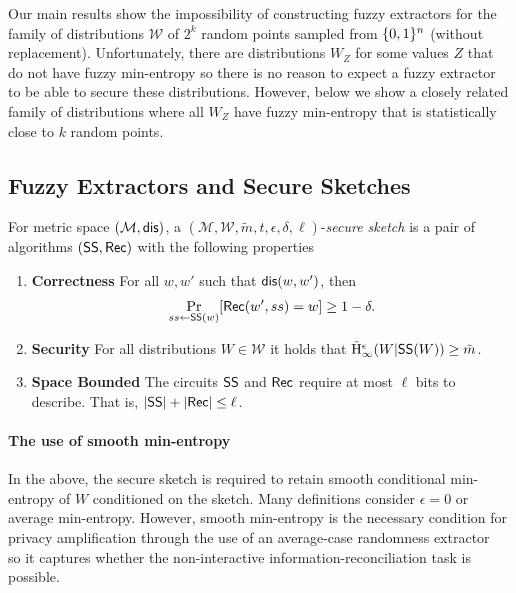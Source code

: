 Our main results show the impossibility of constructing fuzzy extractors for the family of distributions $\mathcal{W}$ of $2^k$ random points sampled from $\{0, 1\}^n$ (without replacement).  Unfortunately, there are distributions $W_Z$ for some values $Z$ that do not have fuzzy min-entropy so there is no reason to expect a fuzzy extractor to be able to secure these distributions.  However, below we show a closely related family of distributions where all $W_Z$ have fuzzy min-entropy that is statistically close to $k$ random points.




\subsection{Fuzzy Extractors and Secure Sketches}
\begin{definition}
For metric space $(\mathcal{M}, \mathsf{dis})$, a $(\mathcal{M}, \mathcal{W}, \tilde{m}, t, \epsilon, \delta, \ell)$-\emph{secure sketch} is a pair of algorithms $({\mathsf{SS}}, {\mathsf{Rec}})$ with the following properties 
\begin{enumerate} 
\itemsep0em
\item \textbf{Correctness} For all $w, w'$ such that $\mathsf{dis}(w, w')$, then \[\Pr_{ss \leftarrow {\ensuremath{\mathsf{SS}}}(w)}[{\mathsf{Rec}}(w', ss) = w]\ge 1-\delta.\]
\item \textbf{Security} For all distributions $W \in \mathcal{W}$ it holds that $\tilde{\mathrm{H}}_\infty^\epsilon(W | {\mathsf{SS}}(W)) \ge \tilde{m}$.
\item \textbf{Space Bounded} The circuits ${\mathsf{SS}}$ and ${\mathsf{Rec}}$ require at most $\ell$ bits to describe.  That is, $|{\mathsf{SS}}| +|{\mathsf{Rec}}|\le \ell$.
\end{enumerate}
\end{definition}

\paragraph{The use of smooth min-entropy} In the above, the secure sketch is required to retain smooth conditional min-entropy of $W$ conditioned on the sketch.  Many definitions consider $\epsilon=0$ or average min-entropy.  However, smooth min-entropy is the necessary condition for privacy amplification through the use of an average-case randomness extractor~\cite{renner2005simple} so it captures whether the non-interactive information-reconciliation task is possible. 

